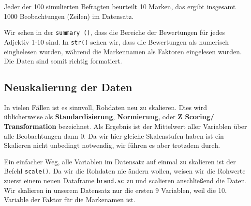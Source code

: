 \documentclass[12pt,]{book}
\begin{document}
Jeder der 100 simulierten Befragten beurteilt 10 Marken, das ergibt
insgesamt 1000 Beobachtungen (Zeilen) im Datensatz.

Wir sehen in der \texttt{summary\ ()}, dass die Bereiche der Bewertungen
für jedes Adjektiv 1-10 sind. In \texttt{str()} sehen wir, dass die
Bewertungen als numerisch einghelesen wurden, während die Markennamen
als Faktoren eingelesen wurden. Die Daten sind somit richtig formatiert.

\subsection{Neuskalierung der Daten}\label{neuskalierung-der-daten}

In vielen Fällen ist es sinnvoll, Rohdaten neu zu skalieren. Dies wird
üblicherweise als \textbf{Standardisierung}, \textbf{Normierung}, oder
\textbf{Z Scoring/ Transformation} bezeichnet. Als Ergebnis ist der
Mittelwert aller Variablen über alle Beobachtungen dann 0. Da wir hier
gleiche Skalenstufen haben ist ein Skalieren nicht unbedingt notwendig,
wir führen es aber trotzdem durch.

Ein einfacher Weg, alle Variablen im Datensatz auf einmal zu skalieren
ist der Befehl \texttt{scale()}. Da wir die Rohdaten nie ändern wollen,
weisen wir die Rohwerte zuerst einem neuen Dataframe \texttt{brand.sc}
zu und scalieren anschließend die Daten. Wir skalieren in unserem
Datensatz nur die ersten 9 Variablen, weil die 10. Variable der Faktor
für die Markenamen ist.
\end{document}
